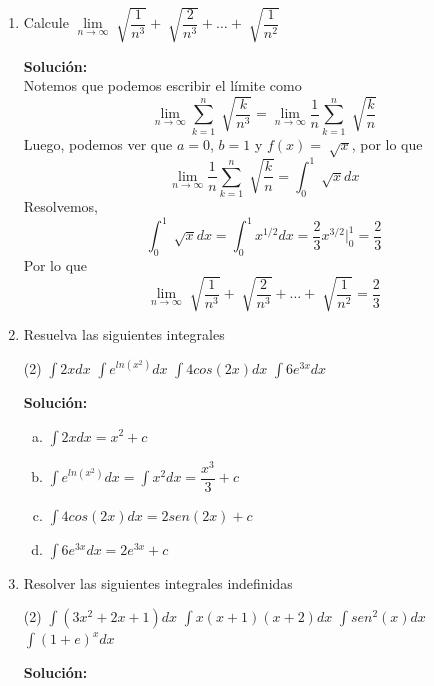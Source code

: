 \documentclass[12pt]{article}
\newenvironment{solucion}
{\begin{mdframed}[backgroundcolor=black!10]
		{\bf Solución:}\\
	}
	{
	\end{mdframed}
}
\newenvironment{preguntas}
{\begin{enumerate}\itemsep12pt
	}
	{
	\end{enumerate}
}
\newcommand{\ev}{\Big|}
\newcommand{\ra}{\rightarrow}
\begin{document}
\begin{preguntas}
\begin{solucion}
\begin{enumerate}[a)]
$$= \lim\limits_{n \ra \infty} \sum\limits_{k=1}^n \dfrac{1}{n} \cdot \dfrac{1+\frac{k}{n}}{1+\left(\frac{k}{n}\right)^2}$$
$$= \lim\limits_{n \ra \infty} \dfrac{1}{n}  \sum\limits_{k=1}^n \dfrac{1+\frac{k}{n}}{1+\left(\frac{k}{n}\right)^2}$$
Ahora, tenemos una Suma de Riemann que esta asociada al intervalo $[0, 1]$ y la función $f(x) = \dfrac{1+x}{1+x^2}$, por lo que
$$\lim\limits_{n \ra \infty} \dfrac{n+1}{n^2+1} + \dfrac{n+2}{n^2+4} + \dots  + \dfrac{n+n}{n^2+n^2} = \int_0^1 \dfrac{1+x}{1+x^2} dx$$
\end{enumerate}
\end{solucion}
\item Calcule $\lim\limits_{n \ra \infty} \sqrt[]{\dfrac{1}{n^3}} + \sqrt[]{\dfrac{2}{n^3}} + \dots  + \sqrt[]{\dfrac{1}{n^2}}$
\begin{solucion}
Notemos que podemos escribir el límite como
$$\lim\limits_{n \ra \infty} \sum\limits_{k=1}^{n}\sqrt[]{\dfrac{k}{n^3}} =
\lim\limits_{n \ra \infty} \dfrac{1}{n} \sum\limits_{k=1}^{n}\sqrt[]{\dfrac{k}{n}}$$
Luego, podemos ver que $a=0$, $b=1$ y $f(x) = \sqrt[]{x}$, por lo que
$$
\lim\limits_{n \ra \infty} \dfrac{1}{n} \sum\limits_{k=1}^{n}\sqrt[]{\dfrac{k}{n}} = \displaystyle\int_0^1\sqrt[]{x}dx$$
Resolvemos,
$$\displaystyle\int_0^1\sqrt[]{x}dx = 
\displaystyle\int_0^1 x^{1/2}dx =
\dfrac{2}{3}x^{3/2} \ev_0^1 =
\dfrac{2}{3}
$$
Por lo que
$$\lim\limits_{n \ra \infty} \sqrt[]{\dfrac{1}{n^3}} + \sqrt[]{\dfrac{2}{n^3}} + \dots  + \sqrt[]{\dfrac{1}{n^2}} = \dfrac{2}{3}$$
\end{solucion}
\item Resuelva las siguientes integrales
\begin{tasks}(2)
\task $\displaystyle\int 2xdx$
\task $\displaystyle\int e^{ln(x^2)}dx$
\task $\displaystyle\int 4cos(2x)dx$
\task $\displaystyle\int 6e^{3x}dx$
\end{tasks}
\begin{solucion}

\begin{enumerate}[a)]
\item $\displaystyle\int 2xdx = x^2 + c$
\item $\displaystyle\int e^{ln(x^2)}dx = \displaystyle\int x^2dx = \dfrac{x^3}{3} + c$
\item $\displaystyle\int 4cos(2x)dx = 2sen(2x) + c$
\item $\displaystyle\int 6e^{3x}dx = 2e^{3x} + c$
\end{enumerate}
\end{solucion}
\item Resolver las siguientes integrales indefinidas
\begin{tasks}(2)
\task $\displaystyle\int (3x^2 + 2x + 1)dx$
\task $\displaystyle\int x(x+1)(x+2)dx$
\task $\displaystyle\int sen^2(x)dx$
\task $\displaystyle\int (1+e)^xdx$
\end{tasks}
\begin{solucion}


\end{solucion}
\end{preguntas}
\end{document}
